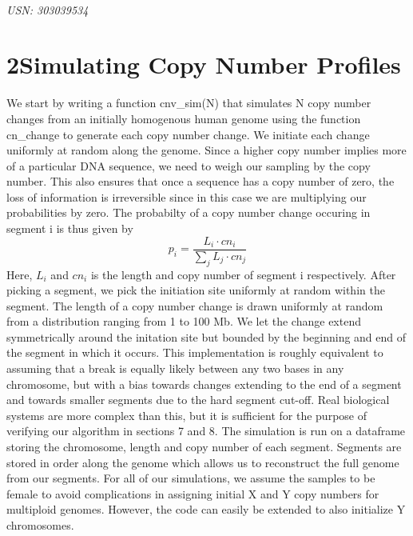 \documentclass[12pt]{article}\usepackage[]{graphicx}\usepackage[]{color}
\begin{document}
\begin{center}
\textbf{\Large{}}\\
\textit{USN: 303039534}
\end{center}



\section*{2\quad Simulating Copy Number Profiles}

We start by writing a function cnv\_sim(N) that simulates N copy number changes from an initially homogenous human genome using the function cn\_change to generate each copy number change. We initiate each change uniformly at random along the genome. Since a higher copy number implies more of a particular DNA sequence, we need to weigh our sampling by the copy number. This also ensures that once a sequence has a copy number of zero, the loss of information is irreversible since in this case we are multiplying our probabilities by zero. The probabilty of a copy number change occuring in segment i is thus given by\\
\begin{equation*}
p_i = \frac{L_i \cdot cn_i}{\sum_j{L_j \cdot cn_j}}
\end{equation*}
Here, $L_i$ and $cn_i$ is the length and copy number of segment i respectively. After picking a segment, we pick the initiation site uniformly at random within the segment. The length of a copy number change is drawn uniformly at random from a distribution ranging from 1 to 100 Mb. We let the change extend symmetrically around the initation site but bounded by the beginning and end of the segment in which it occurs. This implementation is roughly equivalent to assuming that a break is equally likely between any two bases in any chromosome, but with a bias towards changes extending to the end of a segment and towards smaller segments due to the hard segment cut-off. Real biological systems are more complex than this, but it is sufficient for the purpose of verifying our algorithm in sections 7 and 8. The simulation is run on a dataframe storing the chromosome, length and copy number of each segment. Segments are stored in order along the genome which allows us to reconstruct the full genome from our segments. For all of our simulations, we assume the samples to be female to avoid complications in assigning initial X and Y copy numbers for multiploid genomes. However, the code can easily be extended to also initialize Y chromosomes.
\end{document}
